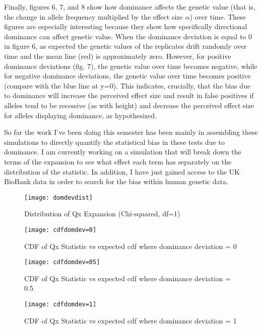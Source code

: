 \documentclass[a4paper,10pt]{article}
\begin{document}
Finally, figures 6, 7, and 8 show how dominance affects the genetic
value (that is, the change in allele frequency multiplied by the effect size $\alpha$)
over time. These figures are especially interesting because they show
how specifically directional dominance can affect genetic value. When the
dominance deviation is equal to 0 in figure 6, as expected the genetic
values of the replicates drift randomly over time and the mean line
(red) is approximately zero. However, for positive dominance
deviations (fig. 7), the genetic value over time becomes negative, while for
negative dominance deviations, the genetic value over time
becomes positive (compare with the blue line at y=0). This indicates, crucially, that the bias due to dominance will
increase the perceived effect size and result in false positives if alleles tend to be recessive 
(as with height) and decrease the perceived effect size for alleles
displaying dominance, as hypothesized.

So far the work I've been doing this semester has been mainly in
assembling these simulations to directly quantify the statistical bias
in these tests due to dominance. I am currently working on a simulation that will break
down the terms of the expansion to see what effect each term has
separately on the distribution of the statistic. In addition, I have just gained access to the
UK BioBank data in order to search for the bias within human genetic
data. 




\pagebreak

\begin{figure}
  \caption{Distribution of Qx Expansion (Chi-squared, df=1)}
  \centering
  \texttt{[image: domdevdist]}
\end{figure}

\begin{figure}
  \caption{CDF of Qx Statistic vs expected cdf where dominance
    deviation = 0}
  \centering
  \texttt{[image: cdfdomdev=0]}
\end{figure}

\begin{figure}
  \caption{CDF of Qx Statistic vs expected cdf where dominance
    deviation = 0.5}
  \centering
  \texttt{[image: cdfdomdev=05]}
\end{figure}

\begin{figure}
  \caption{CDF of Qx Statistic vs expected cdf where dominance
    deviation = 1}
  \centering
  \texttt{[image: cdfdomdev=1]}
\end{figure}
\end{document}
